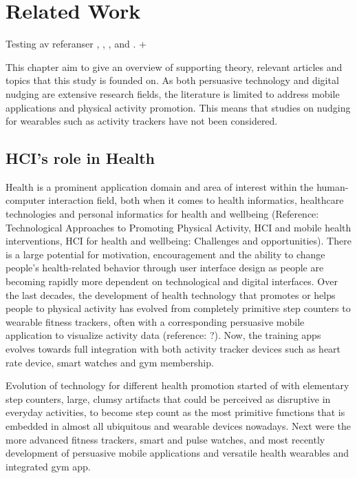 \chapter{Related Work}
Testing av referanser \cite{acquisti_nudges_2017}, \cite{al_stairs_nodate} \cite{suri_stairs_2014}, \cite{fogg_persuasive_2003}, and \cite{hamper_behavior_2016}. +  \cite{karl_chapter_nodate}

This chapter aim to give an overview of supporting theory, relevant articles and topics that this study is founded on. As both persuasive technology and digital nudging are extensive research fields, the literature is limited to address mobile applications and physical activity promotion. This means that studies on nudging for wearables such as activity trackers have not been considered.

\section{HCI's role in Health}
Health is a prominent application domain and area of interest within the human-computer interaction field, both when it comes to health informatics, healthcare technologies and personal informatics for health and wellbeing (Reference: Technological Approaches to Promoting Physical Activity, HCI and mobile health interventions, HCI for health and wellbeing: Challenges and opportunities). There is a large potential for motivation, encouragement and the ability to change people’s health-related behavior through user interface design as people are becoming rapidly more dependent on technological and digital interfaces. Over the last decades, the development of health technology that promotes or helps people to physical activity has evolved from completely primitive step counters to wearable fitness trackers, often with a corresponding persuasive mobile application to visualize activity data (reference: ?). Now, the training apps evolves towards full integration with both activity tracker devices such as heart rate device, smart watches and gym membership. 

Evolution of technology for different health promotion started of with elementary step counters, large, clumsy artifacts that could be perceived as disruptive in everyday activities, to become step count as the most primitive functions that is embedded in almost all ubiquitous and wearable devices nowadays. Next were the more advanced fitness trackers, smart and pulse watches, and most recently development of persuasive mobile applications and versatile health wearables and integrated gym app.

